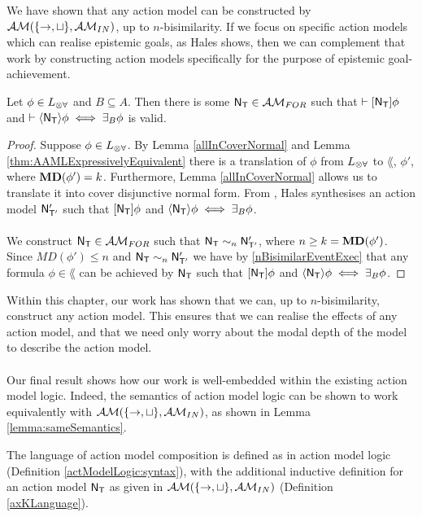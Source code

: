 We have shown that any action model can be constructed by $\mathcal{AM}(\{\to, \sqcup\}, \mathcal{AM}_{IN})$, up to $n$-bisimilarity.
If we focus on specific action models which can realise epistemic goals, as Hales
\cite{hales13synthesis} shows, then we can complement that work by constructing action models
specifically for the purpose of epistemic goal-achievement.

\begin{corr} \label{approximatingBRestricted}
Let $\phi \in L_{\otimes\forall}$ and $B \subseteq A$.
Then there is some $\mathrm{\mathsf{N}}_\mathrm{\mathsf{T}} \in \mathcal{AM}_{FOR}$ such that $\vdash [{\mathrm{\mathsf{N}}_\mathrm{\mathsf{T}}}] \phi$ and
$\vdash \langle { \ensuremath {\mathrm{\mathsf{N}}} _ \ensuremath {\mathrm{\mathsf{T}}} } \rangle \phi \iff \exists_B \phi$ is valid.
\end{corr}

\begin{proof}
Suppose $\phi \in L_{\otimes\forall}$.
By Lemma \ref{allInCoverNormal} and Lemma \ref{thm:AAMLExpressivelyEquivalent} there is a
translation of $\phi$ from $L_{\otimes\forall}$ to $\lang$, $\phi'$, where ${\bf MD}(\phi') = k$.
Furthermore, Lemma \ref{allInCoverNormal} allows us to translate it into cover disjunctive normal form.
From \cite{hales13synthesis}, Hales synthesises an action model $\mathrm{\mathsf{N}}'_{\mathrm{\mathsf{T}}'}$ such that $[{\mathrm{\mathsf{N}}_\mathrm{\mathsf{T}}}] \phi$ and $\langle { \ensuremath {\mathrm{\mathsf{N}}} _ \ensuremath {\mathrm{\mathsf{T}}} } \rangle
\phi \iff \exists_B \phi$.\\
\\
We construct $\mathrm{\mathsf{N}}_\mathrm{\mathsf{T}} \in \mathcal{AM}_{FOR}$ such that $\mathrm{\mathsf{N}}_\mathrm{\mathsf{T}} \sim_n \mathrm{\mathsf{N}}'_{\mathrm{\mathsf{T}}'}$, where $n \geq
k = {\bf MD}(\phi')$.
Since $MD(\phi') \leq n$ and $\mathrm{\mathsf{N}}_\mathrm{\mathsf{T}} \sim_n \mathrm{\mathsf{N}}'_{\mathrm{\mathsf{T}}'}$ we have by \ref{nBisimilarEventExec} that any
formula $\phi \in \lang$ can be achieved by $\mathrm{\mathsf{N}}_\mathrm{\mathsf{T}}$ such that $[{\mathrm{\mathsf{N}}_\mathrm{\mathsf{T}}}] \phi$ and $\langle { \ensuremath {\mathrm{\mathsf{N}}} _ \ensuremath {\mathrm{\mathsf{T}}} } \rangle \phi
\iff \exists_B \phi$.
\end{proof}

Within this chapter, our work has shown that we can, up to $n$-bisimilarity,
construct any action
model.
This ensures that we can realise the effects of any action model, and that we need only worry about
the modal depth of the model to describe the action model.\\
\\
Our final result shows how our work is well-embedded within the existing action model logic.
Indeed, the semantics of action model logic can be shown to work equivalently with $\mathcal{AM}(\{\to,
\sqcup\}, \mathcal{AM}_{IN})$, as shown in Lemma \ref{lemma:sameSemantics}.

\begin{defn} \label{defn:actionModelComposition}
	The language of action model composition is defined as in action model logic (Definition
	\ref{actModelLogic:syntax}), with the additional inductive definition for an action model
	$\mathrm{\mathsf{N}}_\mathrm{\mathsf{T}}$ as given in $\mathcal{AM}(\{\to, \sqcup\}, \mathcal{AM}_{IN})$ (Definition \ref{axKLanguage}).
\end{defn}

